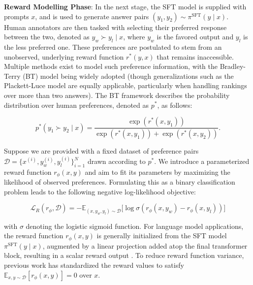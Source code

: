\textbf{Reward Modelling Phase}: In the next stage, the SFT model is supplied with prompts $x$, and is used to generate answer pairs $(y_1, y_2) \sim \pi^\text{SFT}(y \mid x)$. Human annotators are then tasked with selecting their preferred response between the two, denoted as $y_w \succ y_l \mid x$, where $y_w$ is the favored output and $y_l$ is the less preferred one. These preferences are postulated to stem from an unobserved, underlying reward function $r^*(y, x)$ that remains inaccessible. Multiple methods exist to model such preference information, with the Bradley-Terry (BT) model \cite{bradley1952rankanalysis} being widely adopted (though generalizations such as the Plackett-Luce model \citep{plackett1975analysis, luce2012individual} are equally applicable, particularly when handling rankings over more than two answers). The BT framework describes the probability distribution over human preferences, denoted as $p^*$, as follows:

\begin{equation}\label{eq:bradley-terry}
    p^*(y_1\succ y_2 \mid x)=\frac{\exp\left(r^*(x, y_1)\right)}{\exp\left(r^*(x, y_1)\right) + \exp\left(r^*(x, y_2)\right)}.
\end{equation}

Suppose we are provided with a fixed dataset of preference pairs $\mathcal{D}=\bigl\{x^{(i)}, y_w^{(i)}, y_l^{(i)}\bigr\}_{i=1}^N$ drawn according to $p^*$. We introduce a parameterized reward function $r_{\phi}(x, y)$ and aim to fit its parameters by maximizing the likelihood of observed preferences. Formulating this as a binary classification problem leads to the following negative log-likelihood objective:

\begin{equation}\label{eq:reward_model}
    \mathcal{L}_R(r_{\phi}, \mathcal{D}) = -\mathbb{E}_{(x, y_w, y_l)\sim \mathcal{D}}\bigl[\log \sigma(r_{\phi}(x, y_w)- r_{\phi}(x, y_l))\bigr]
\end{equation}

with $\sigma$ denoting the logistic sigmoid function. For language model applications, the reward function $r_{\phi}(x, y)$ is generally initialized from the SFT model $\pi^\text{SFT}(y \mid x)$, augmented by a linear projection added atop the final transformer block, resulting in a scalar reward output \cite{ziegler2020finetuning}. To reduce reward function variance, previous work has standardized the reward values to satisfy $\mathbb{E}_{x,y\sim \mathcal{D}}\left[r_\phi(x, y)\right] = 0$ over $x$.

